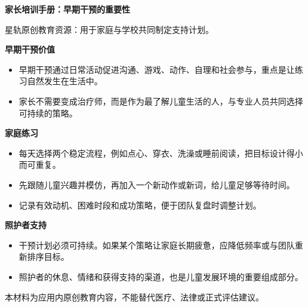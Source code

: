 \documentclass[11pt]{article}
\begin{document}
{\color[HTML]{1F5FD2}\LARGE\bfseries 家长培训手册：早期干预的重要性\par}
{\color[HTML]{667085}\small 星轨原创教育资源：用于家庭与学校共同制定支持计划。\par}
\vspace{0.8em}
{\color[HTML]{111827}\large\bfseries 早期干预价值\par}
\begin{itemize}
\item 早期干预通过日常活动促进沟通、游戏、动作、自理和社会参与，重点是让练习自然发生在生活中。
\item 家长不需要变成治疗师，而是作为最了解儿童生活的人，与专业人员共同选择可持续的策略。
\end{itemize}
{\color[HTML]{111827}\large\bfseries 家庭练习\par}
\begin{itemize}
\item 每天选择两个稳定流程，例如点心、穿衣、洗澡或睡前阅读，把目标设计得小而可重复。
\item 先跟随儿童兴趣并模仿，再加入一个新动作或新词，给儿童足够等待时间。
\item 记录有效动机、困难时段和成功策略，便于团队复盘时调整计划。
\end{itemize}
{\color[HTML]{111827}\large\bfseries 照护者支持\par}
\begin{itemize}
\item 干预计划必须可持续。如果某个策略让家庭长期疲惫，应降低频率或与团队重新排序目标。
\item 照护者的休息、情绪和获得支持的渠道，也是儿童发展环境的重要组成部分。
\end{itemize}
\vfill
{\color[HTML]{667085}\footnotesize 本材料为应用内原创教育内容，不能替代医疗、法律或正式评估建议。\par}
\end{document}
